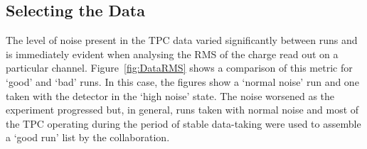 \subsection{Selecting the Data}\label{sec:SelectingTheData}

The level of noise present in the TPC data varied significantly between runs and is immediately evident when analysing the RMS of the charge read out on a particular channel.  Figure~\ref{fig:DataRMS} shows a comparison of this metric for `good' and `bad' runs.  In this case, the figures show a `normal noise' run and one taken with the detector in the `high noise' state.  The noise worsened as the experiment progressed but, in general, runs taken with normal noise and most of the TPC operating during the period of stable data-taking were used to assemble a `good run' list by the collaboration.

